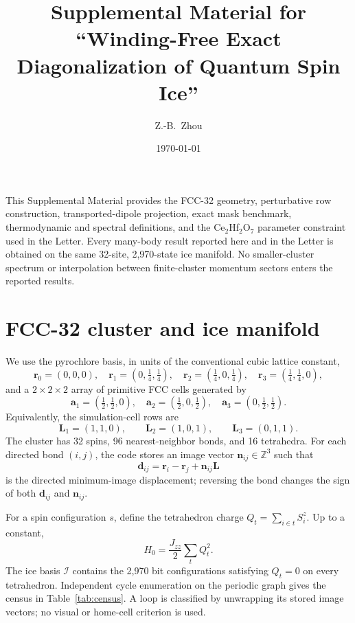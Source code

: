\documentclass[aps,prl,onecolumn,amsmath,amssymb,superscriptaddress]{revtex4-2}
\newcommand{\Jzz}{J_{zz}}
\newcommand{\br}{\bm r}
\newcommand{\ice}{\mathcal I}
\begin{document}
\title{Supplemental Material for ``Winding-Free Exact Diagonalization of Quantum Spin Ice''}
\author{Z.-B.~Zhou}
\date{\today}
\maketitle

This Supplemental Material provides the FCC-32 geometry, perturbative row
construction, transported-dipole projection, exact mask benchmark,
thermodynamic and spectral definitions, and the Ce$_2$Hf$_2$O$_7$ parameter
constraint used in the Letter. Every many-body result reported here and in
the Letter is obtained on the same 32-site, 2,970-state ice manifold. No
smaller-cluster spectrum or interpolation between finite-cluster momentum
sectors enters the reported results.

\section{FCC-32 cluster and ice manifold}
\label{sec:geometry}

We use the pyrochlore basis, in units of the conventional cubic lattice
constant,
\begin{equation}
 \br_0=(0,0,0),\quad \br_1=(0,\tfrac14,\tfrac14),\quad
 \br_2=(\tfrac14,0,\tfrac14),\quad
 \br_3=(\tfrac14,\tfrac14,0),
\end{equation}
and a $2\times2\times2$ array of primitive FCC cells generated by
\begin{equation}
 \bm a_1=(\tfrac12,\tfrac12,0),\quad
 \bm a_2=(\tfrac12,0,\tfrac12),\quad
 \bm a_3=(0,\tfrac12,\tfrac12).
\end{equation}
Equivalently, the simulation-cell rows are
\begin{equation}
 \bm L_1=(1,1,0),\qquad \bm L_2=(1,0,1),\qquad
 \bm L_3=(0,1,1).
\end{equation}
The cluster has 32 spins, 96 nearest-neighbor bonds, and 16 tetrahedra. For
each directed bond $(i,j)$, the code stores an image vector
$\bm n_{ij}\in\mathbb Z^3$ such that
\begin{equation}
 \bm d_{ij}=\br_i-\br_j+\bm n_{ij}\bm L
\end{equation}
is the directed minimum-image displacement; reversing the bond changes the
sign of both $\bm d_{ij}$ and $\bm n_{ij}$.

For a spin configuration $s$, define the tetrahedron charge
$Q_t=\sum_{i\in t}S_i^z$. Up to a constant,
\begin{equation}
 H_0=\frac{\Jzz}{2}\sum_tQ_t^2 .
\label{eq:H0}
\end{equation}
The ice basis $\ice$ contains the 2,970 bit configurations satisfying
$Q_t=0$ on every tetrahedron. Independent cycle enumeration on the periodic
graph gives the census in Table~\ref{tab:census}. A loop is classified by
unwrapping its stored image vectors; no visual or home-cell criterion is
used.
\end{document}
